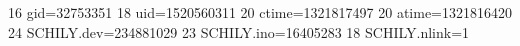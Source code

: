 16 gid=32753351
18 uid=1520560311
20 ctime=1321817497
20 atime=1321816420
24 SCHILY.dev=234881029
23 SCHILY.ino=16405283
18 SCHILY.nlink=1
